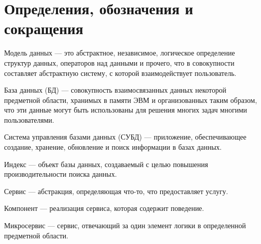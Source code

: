 \section*{Определения, обозначения и сокращения}

Модель данных --- это абстрактное, независимое, логическое определение структур данных, операторов над данными и прочего, что в совокупности составляет абстрактную систему, с которой взаимодействует пользователь.

База данных (БД) --- совокупность взаимосвязанных данных некоторой предметной области, хранимых в памяти ЭВМ и организованных таким образом, что эти данные могут быть использованы для решения многих задач многими пользователями.


Система управления базами данных (СУБД) --- приложение, обеспечивающее создание, хранение, обновление и поиск информации в базах данных.

Индекс --- объект базы данных, создаваемый с целью повышения производительности поиска данных.

Сервис --- абстракция, определяющая что-то, что предоставляет услугу.

Компонент --- реализация сервиса, которая содержит поведение.

Микросервис --- сервис, отвечающий за один элемент логики в определенной предметной области.


\pagebreak
